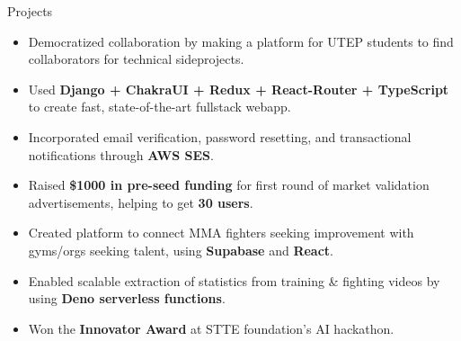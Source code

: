 \documentclass{resume} %
\begin{document}
\begin{workSection}{Projects}
	
	\customItem[
	title=\href{https://github.com/AshkanArabim/hackerhunt}{hackerhunt.tech \faExternalLink},
	duration=Solo | January 2025 - present,
	]
	\begin{itemize}
		\vspace{-0.5em}
		\itemsep -6pt {}
		\item Democratized collaboration by making a platform for UTEP students to find collaborators for technical sideprojects. 
		\item Used \textbf{Django + ChakraUI + Redux + React-Router + TypeScript} to create fast, state-of-the-art fullstack webapp.
		\item Incorporated email verification, password resetting, and transactional notifications through \textbf{AWS SES}.
		\item Raised \textbf{\$1000 in pre-seed funding} for first round of market validation advertisements, helping to get \textbf{30 users}. %
	\end{itemize}
	
	\customItem[
	title=Athlytix,
	duration=Team of 4 | April 2025 - May 2025,
	]
	\begin{itemize}
		\vspace{-0.5em}
		\itemsep -6pt {}
		\item Created platform to connect MMA fighters seeking improvement with gyms/orgs seeking talent, using \textbf{Supabase} and \textbf{React}.
		\item Enabled scalable extraction of statistics from training \& fighting videos by using \textbf{Deno serverless functions}.
		\item Won the \textbf{Innovator Award} at STTE foundation's AI hackathon.
	\end{itemize}

	

\end{workSection}
\end{document}
